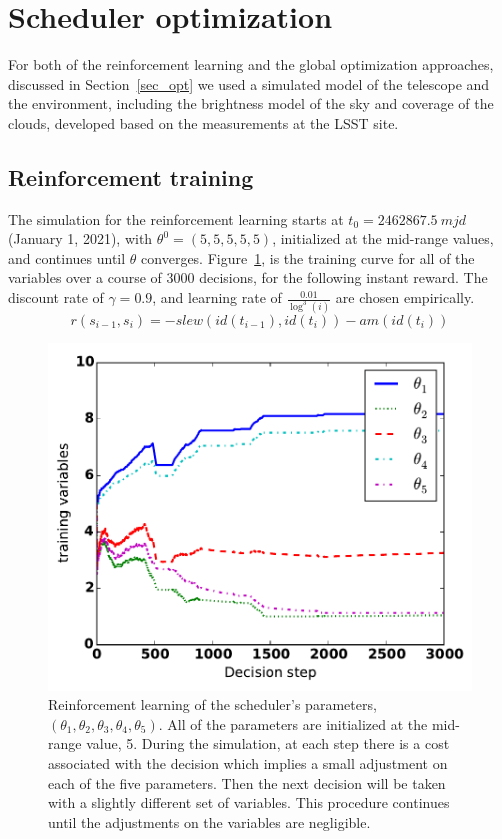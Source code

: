 \documentclass[11pt]{article}
\theoremstyle{definition}
\begin{document}
\section{Scheduler optimization}\label{sec_lsst_opt}
For both of the reinforcement learning and the global optimization approaches, discussed in Section~\ref{sec_opt} we used a simulated model of the telescope and the environment, including the brightness model of the sky and coverage of the clouds, developed based on the measurements at the LSST site. 

\subsection{Reinforcement training}
The simulation for the reinforcement learning starts at $t_0 = 2462867.5~mjd$ (January 1, 2021), with $\theta^0 = (5,5,5,5,5)$, initialized at the mid-range values, and continues until $\theta$ converges. Figure~\ref{fig_theta_conv}, is the training curve for all of the variables over a course of 3000 decisions, for the following instant reward. The discount rate of $\gamma = 0.9$, and learning rate of $\frac{0.01}{\log^3(i)}$ are chosen empirically. 
\begin{equation}
r(s_{i-1}, s_i) = -slew(id(t_{i-1}), id(t_{i})) - am(id(t_i))
\end{equation}
\begin{figure}[h!]
\begin{center}
\includegraphics[width=0.5\linewidth]{Figures/TDcurve.pdf}
\end{center}
\caption{Reinforcement learning of the scheduler's parameters, $(\theta_1,\theta_2,\theta_3,\theta_4,\theta_5)$. All of the parameters are initialized at the mid-range value, 5. During the simulation, at each step there is a cost associated with the decision which implies a small adjustment on each of the five parameters. Then the next decision will be taken with a slightly different set of variables. This procedure continues until the adjustments on the variables are negligible.}
\label{fig_theta_conv}
\end{figure}
\end{document}
